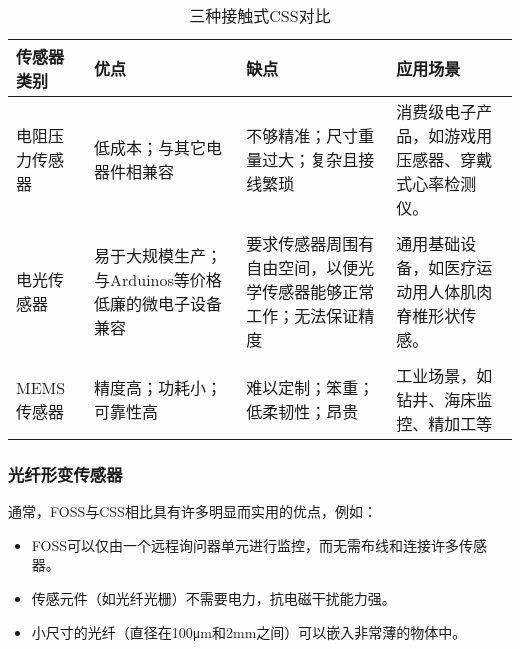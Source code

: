 \begin{table}[h]\footnotesize
\caption{三种接触式CSS对比}
\label{table:css}
\begin{center}
\begin{tabular}{p{}p{}p{}p{}}
\toprule
\textbf{传感器类别} & \textbf{优点} &\textbf{缺点} & \textbf{应用场景}\\

\midrule

电阻压力传感器 &
低成本；与其它电器件相兼容& 
不够精准；尺寸重量过大；复杂且接线繁琐&
消费级电子产品，如游戏用压感器、穿戴式心率检测仪。
\\
\\

电光传感器 &
易于大规模生产；与Arduinos等价格低廉的微电子设备兼容&
要求传感器周围有自由空间，以便光学传感器能够正常工作；无法保证精度 &
通用基础设备，如医疗运动用人体肌肉脊椎形状传感。
\\
\\

MEMS传感器 & 
精度高；功耗小；可靠性高& 
难以定制；笨重；低柔韧性；昂贵&
工业场景，如钻井、海床监控、精加工等\\
\bottomrule
\end{tabular}
\end{center}
\end{table}

\FloatBarrier
\subsubsection{光纤形变传感器}
通常，FOSS与CSS相比具有许多明显而实用的优点，例如：
\begin{itemize}
\setlength{\topsep}{0pt}
\setlength{\itemsep}{0pt}
\setlength{\parsep}{0pt}
\setlength{\parskip}{0pt}
\item FOSS可以仅由一个远程询问器单元进行监控，而无需布线和连接许多传感器。
\item 传感元件（如光纤光栅）不需要电力，抗电磁干扰能力强。
\item 小尺寸的光纤（直径在100μm和2mm之间）可以嵌入非常薄的物体中。
\end{itemize}


